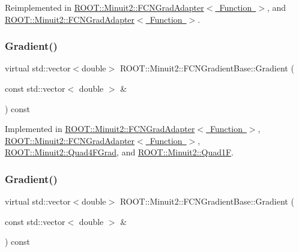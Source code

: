 Reimplemented in \mbox{\hyperlink{classROOT_1_1Minuit2_1_1FCNGradAdapter_a10faf0c868284a440f291465b7efd08e}{R\+O\+O\+T\+::\+Minuit2\+::\+F\+C\+N\+Grad\+Adapter$<$ Function $>$}}, and \mbox{\hyperlink{classROOT_1_1Minuit2_1_1FCNGradAdapter_a10faf0c868284a440f291465b7efd08e}{R\+O\+O\+T\+::\+Minuit2\+::\+F\+C\+N\+Grad\+Adapter$<$ Function $>$}}.

\mbox{\label{classROOT_1_1Minuit2_1_1FCNGradientBase_a004740e7e25a1358aafde6694196ef88}} 
\subsubsection{\texorpdfstring{Gradient()}{Gradient()}\hspace{0.1cm}{\footnotesize\ttfamily [1/2]}}
{\footnotesize\ttfamily virtual std\+::vector$<$double$>$ R\+O\+O\+T\+::\+Minuit2\+::\+F\+C\+N\+Gradient\+Base\+::\+Gradient (\begin{DoxyParamCaption}\item[{const std\+::vector$<$ double $>$ \&}]{ }\end{DoxyParamCaption}) const\hspace{0.3cm}{\ttfamily [pure virtual]}}



Implemented in \mbox{\hyperlink{classROOT_1_1Minuit2_1_1FCNGradAdapter_ae91d0453fd5e953f75551576659d6c7b}{R\+O\+O\+T\+::\+Minuit2\+::\+F\+C\+N\+Grad\+Adapter$<$ Function $>$}}, \mbox{\hyperlink{classROOT_1_1Minuit2_1_1FCNGradAdapter_ae91d0453fd5e953f75551576659d6c7b}{R\+O\+O\+T\+::\+Minuit2\+::\+F\+C\+N\+Grad\+Adapter$<$ Function $>$}}, \mbox{\hyperlink{classROOT_1_1Minuit2_1_1Quad4FGrad_afd3b64a4236e31bdf9c330e33ac7ac89}{R\+O\+O\+T\+::\+Minuit2\+::\+Quad4\+F\+Grad}}, and \mbox{\hyperlink{classROOT_1_1Minuit2_1_1Quad1F_a5862cb7b7c00f86bcff155d0033abd7f}{R\+O\+O\+T\+::\+Minuit2\+::\+Quad1F}}.

\mbox{\label{classROOT_1_1Minuit2_1_1FCNGradientBase_a004740e7e25a1358aafde6694196ef88}} 
\subsubsection{\texorpdfstring{Gradient()}{Gradient()}\hspace{0.1cm}{\footnotesize\ttfamily [2/2]}}
{\footnotesize\ttfamily virtual std\+::vector$<$double$>$ R\+O\+O\+T\+::\+Minuit2\+::\+F\+C\+N\+Gradient\+Base\+::\+Gradient (\begin{DoxyParamCaption}\item[{const std\+::vector$<$ double $>$ \&}]{ }\end{DoxyParamCaption}) const\hspace{0.3cm}{\ttfamily [pure virtual]}}



